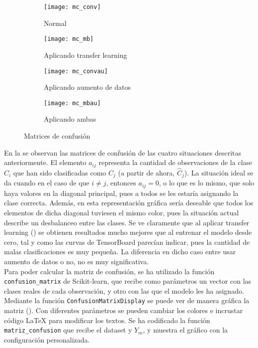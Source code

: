 				\begin{figure}[!h]
					\centering
					\begin{subfigure}{.4\textwidth}
						\centering
						\texttt{[image: mc\_conv]}
						\caption{Normal}
						\label{fig:mc_conv}
					\end{subfigure}\hfill
					\begin{subfigure}{.4\textwidth}
						\centering
						\texttt{[image: mc\_mb]}
						\caption{Aplicando transfer learning}
						\label{fig:mc_mb}
					\end{subfigure}
					\begin{subfigure}{.4\textwidth}
						\centering
						\texttt{[image: mc\_convau]}
						\caption{Aplicando aumento de datos}
						\label{fig:mc_convau}
					\end{subfigure}\hfill
					\begin{subfigure}{.4\textwidth}
						\centering
						\texttt{[image: mc\_mbau]}
						\caption{Aplicando ambas}
						\label{fig:mc_mbau}
					\end{subfigure}
					\caption{Matrices de confusión}
					\label{fig:mc}
				\end{figure}
				
				En la  se observan las matrices de confusión de las cuatro situaciones descritas anteriormente. El elemento $a_{ij}$ representa la cantidad de observaciones de la clase $C_i$ que han sido clasificadas como $C_j$ (a partir de ahora, $\hat{C}_j$). La situación ideal se da cuando en el caso de que $i \neq j$, entonces $a_{ij} = 0$, o lo que es lo mismo, que solo haya valores  en la diagonal principal, pues a todos se les estaría asignando la clase correcta. Además, en esta representación gráfica sería deseable que todos los elementos de dicha diagonal tuviesen el mismo color, pues la situación actual describe un desbalanceo entre las clases. Se ve claramente que al aplicar transfer learning () se obtienen resultados mucho mejores que al entrenar el modelo desde cero, tal y como las curvas de TensorBoard parecían indicar, pues la cantidad de malas clasificaciones es muy pequeña. La diferencia en dicho caso entre usar aumento de datos o no, no es muy significativa. \\
				
				Para poder calcular la matriz de confusión, se ha utilizado la función \texttt{confusion\_matrix} de Scikit-learn, que recibe como parámetros un vector con las clases reales de cada observación, y otro con las que el modelo les ha asignado. Mediante la función \texttt{ConfusionMatrixDisplay} se puede ver de manera gráfica la matriz (). Con diferentes parámetros se pueden cambiar los colores e incrustar código \LaTeX{} para modificar los textos. Se ha codificado la función \texttt{matriz\_confusion} que recibe el dataset y $Y_m$, y muestra el gráfico con la configuración personalizada. 
				
